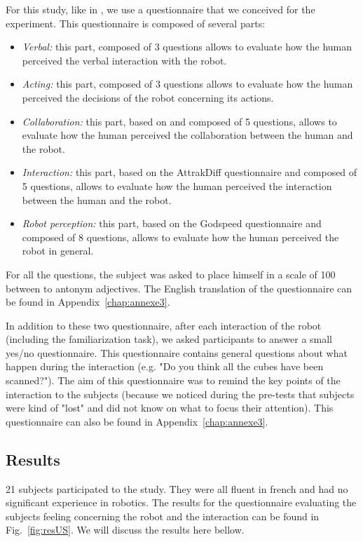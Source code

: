 \documentclass[english,a4paper,11pt,twoside]{StyleThese}
\begin{document}
For this study, like in \cite{heerink2010relating, fischer2016between}, we use a questionnaire that we conceived for the experiment. This questionnaire is composed of several parts:
\begin{itemize}
\item \textit{Verbal:} this part, composed of 3 questions allows to evaluate how the human perceived the verbal interaction with the robot.
\item \textit{Acting:} this part, composed of 3 questions allows to evaluate how the human perceived the decisions of the robot concerning its actions.
\item \textit{Collaboration:} this part, based on \cite{weistroffer2014etude} and composed of 5 questions, allows to evaluate how the human perceived the collaboration between the human and the robot.
\item \textit{Interaction:} this part, based on the AttrakDiff questionnaire \cite{lallemand2015creation} and composed of 5 questions, allows to evaluate how the human perceived the interaction between the human and the robot.
\item \textit{Robot perception:} this part, based on the Godspeed questionnaire \cite{bartneck2009measurement} and composed of 8 questions, allows to evaluate how the human perceived the robot in general.
\end{itemize}
For all the questions, the subject was asked to place himself in a scale of 100 between to antonym adjectives. The English translation of the questionnaire can be found in Appendix~\ref{chap:annexe3}.

In addition to these two questionnaire, after each interaction of the robot (including the familiarization task), we asked participants to answer a small  yes/no questionnaire. This questionnaire contains general questions about what happen during the interaction (e.g. "Do you think all the cubes have been scanned?"). The aim of this questionnaire was to remind the key points of the interaction to the subjects (because we noticed during the pre-tests that subjects were kind of "lost" and did not know on what to focus their attention). This questionnaire can also be found in Appendix~\ref{chap:annexe3}.

\subsection{Results}

21 subjects participated to the study. They were all fluent in french and had no significant experience in robotics. The results for the questionnaire evaluating the subjects feeling concerning the robot and the interaction can be found in Fig.~\ref{fig:resUS}. We will discuss the results here bellow.
\end{document}
